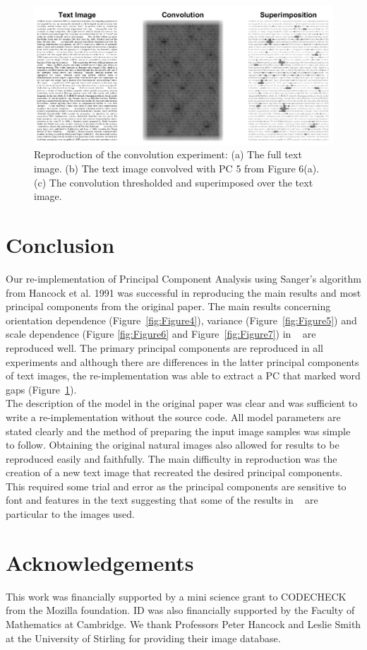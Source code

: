 \begin{figure}
    \centering
    \includegraphics[scale=0.55]{figures/Figure8.png}
    \caption{Reproduction of the convolution experiment: (a) The full text image. (b) The text image convolved with PC 5 from Figure 6(a). (c) The convolution thresholded and superimposed over the text image.}
    \label{fig:Figure8}
\end{figure}

\section{Conclusion}
Our re-implementation of Principal Component Analysis using Sanger's algorithm from Hancock et al. 1991 was successful in reproducing the main results and most principal components from the original paper. The main results concerning orientation dependence (Figure~\ref{fig:Figure4}), variance (Figure~\ref{fig:Figure5}) and scale dependence (Figure \ref{fig:Figure6} and Figure~\ref{fig:Figure7}) in ~\cite{Hancock1992-mp} are reproduced well. The primary principal components are reproduced in all experiments and although there are differences in the latter principal components of text images, the re-implementation was able to extract a PC that marked word gaps (Figure~\ref{fig:Figure8}).\\
The description of the model in the original paper was clear and was sufficient to write a re-implementation without the source code. All model parameters are stated clearly and the method of preparing the input image samples was simple to follow. Obtaining the original natural images also allowed for results to be reproduced easily and faithfully. The main difficulty in reproduction was the creation of a new text image that recreated the desired principal components. This required some trial and error as the principal components are sensitive to font and features in the text suggesting that some of the results in ~\cite{Hancock1992-mp} are particular to the images used.

\section{Acknowledgements}
This work was financially supported by a mini science grant to CODECHECK
from the Mozilla foundation.  ID was also financially supported by the
Faculty of Mathematics at Cambridge.  We thank Professors Peter Hancock
and Leslie Smith at the University of Stirling for providing their
image database.
